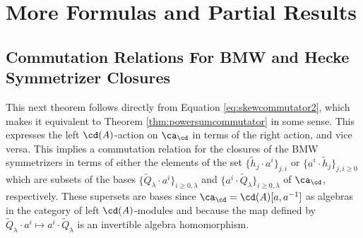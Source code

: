 \chapter{More Formulas and Partial Results}


\section{Commutation Relations For BMW and Hecke Symmetrizer Closures} \label{sec:morecommutationrelations}

This next theorem follows directly from Equation \eqref{eq:skewcommutator2}, which makes it equivalent to Theorem \ref{thm:powersumcommutator} in some sense. This expresses the left $\cd(A)$-action on $\ca_\cd$ in terms of the right action, and vice versa. This implies a commutation relation for the closures of the BMW symmetrizers in terms of either the elements of the set $\{\tilde{h}_j \cdot a^i \}_{j, i}$ or $\{ a^i \cdot \tilde{h}_j \}_{j, i \geq 0}$ which are subsets of the bases $\{ \widetilde{Q}_\lambda \cdot a^i \}_{i \geq 0, \lambda}$ and $\{ a^i \cdot \widetilde{Q}_\lambda \}_{i \geq 0, \lambda}$ of $\ca_\cd$, respectively. These supersets are bases since $\ca_\cd = \cd(A)[a, a^{-1}]$ as algebras in the category of left $\cd(A)$-modules and because the map defined by $\widetilde{Q}_\lambda \cdot a^i \mapsto a^i \cdot \widetilde{Q}_\lambda$ is an invertible algebra homomorphism. 

